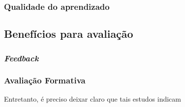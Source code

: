 \subsubsection{Qualidade do aprendizado}

\subsection{Benefícios para avaliação}

\subsubsection{\textit{Feedback}}

\subsubsection{Avaliação Formativa}


Entretanto, é preciso deixar claro que tais estudos indicam



% 
